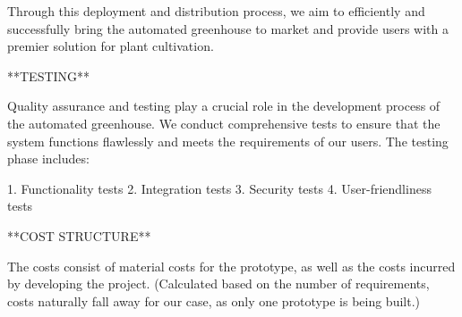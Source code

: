 Through this deployment and distribution process, we aim to efficiently and successfully bring the automated greenhouse to market and provide users with a premier solution for plant cultivation.

**TESTING**

Quality assurance and testing play a crucial role in the development process of the automated greenhouse. We conduct comprehensive tests to ensure that the system functions flawlessly and meets the requirements of our users. The testing phase includes:
  
1. Functionality tests
2. Integration tests
3. Security tests
4. User-friendliness tests

**COST STRUCTURE**

The costs consist of material costs for the prototype, as well as the costs incurred by developing the project. (Calculated based on the number of requirements, costs naturally fall away for our case, as only one prototype is being built.)
